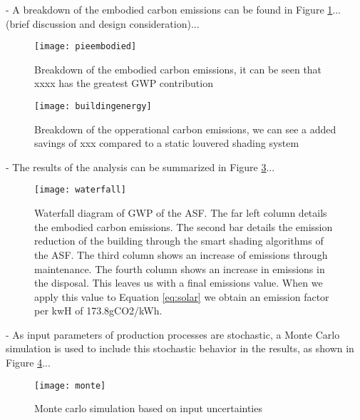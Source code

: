 


- A breakdown of the embodied carbon emissions can be found in Figure  \ref{fig:embodied}... (brief discussion and design consideration)...

\begin{figure}[H]
\begin{center}
\texttt{[image: pieembodied]}
\caption{Breakdown of the embodied carbon emissions, it can be seen that xxxx has the greatest GWP contribution}
\label{fig:embodied}
\end{center}
\end{figure}


\begin{figure}[H]
\begin{center}
\texttt{[image: buildingenergy]}
\caption{Breakdown of the opperational carbon emissions, we can see a added savings of xxx compared to a static louvered shading system}
\label{fig:operational}
\end{center}
\end{figure}

- The results of the analysis can be summarized in Figure \ref{fig:waterfall}...

\begin{figure}[H]
\begin{center}
\texttt{[image: waterfall]}
\caption{Waterfall diagram of GWP of the ASF. The far left column details the embodied carbon emissions. The second bar details the emission reduction of the building through the smart shading algorithms of the ASF. The third column shows an increase of emissions through maintenance. The fourth column shows an increase in emissions in the disposal. This leaves us with a final emissions value. When we apply this value to Equation \ref{eq:solar} we obtain an emission factor per kwH of 173.8gCO2/kWh.}
\label{fig:waterfall}
\end{center}
\end{figure}


- As input parameters of production processes are stochastic, a Monte Carlo simulation is used to include this stochastic behavior in the results, as shown in Figure \ref{fig:monte}...

\begin{figure}[H]
\begin{center}
\texttt{[image: monte]}
\caption{Monte carlo simulation based on input uncertainties}
\label{fig:monte}
\end{center}
\end{figure}

